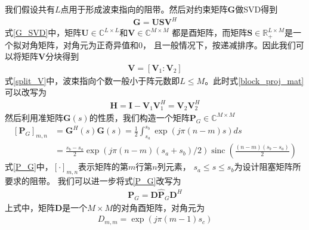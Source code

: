 \documentclass[master]{thesis-uestc}
\begin{document}
我们假设共有$L$点用于形成波束指向的阻带。然后对约束矩阵$\bm{G}$做SVD得到
\begin{equation}\label{G_SVD}
    \begin{aligned}
        \bm{G} = \bm{U}\bm{S}\bm{V}^H
    \end{aligned}
\end{equation}
式\eqref{G_SVD}中，矩阵$\bm{U}\in\mathbb{C}^{L\times L}$和$\bm{V}\in\mathbb{C}^{M\times M}$
都是酉矩阵，而矩阵$\bm{S}\in\mathbb{R}^{L\times M}_+$是一个拟对角矩阵，对角元为正奇异值和$0$，
且一般情况下，按递减排序。因此我们可以将矩阵$\bm{V}$分块得到
\begin{equation}\label{split_V}
    \begin{aligned}
        \bm{V} = \left[\bm{V}_1:\bm{V}_2\right]
    \end{aligned}
\end{equation}
式\eqref{split_V}中，波束指向个数一般小于阵元数即$L\le M$。此时式\eqref{block_proj_mat}可以改写为
\begin{equation}\label{block_proj_mat_V}
    \begin{aligned}
        \bm{H} = \bm{I} - \bm{V}_1\bm{V}_1^H = \bm{V}_2\bm{V}_2^H
    \end{aligned}
\end{equation}
然后利用准矩阵$\bm{G}(s)$的性质，我们构造一个矩阵$\bm{P}_G\in\mathbb{C}^{M\times M}$
\begin{equation}\label{P_G}
    \begin{aligned}
        \left[\bm{P}_G\right]_{m,n} &= \bm{G}^H(s)\bm{G}(s)
                                     = \frac{1}{2}\int_{s_a}^{s_b}\exp\left(j\pi(n-m)s\right)ds
        \\
                                    &= \frac{s_b-s_a}{2}\exp\left(j\pi(n-m)(s_a+s_b)/2\right)
                                       \operatorname{sinc}\left(\frac{(n-m)(s_b-s_a)}{2}\right)
    \end{aligned}
\end{equation}
式\eqref{P_G}中，$[\cdot]_{m,n}$表示矩阵的第$m$行第$n$列元素，
$s_a\le s \le s_b$为设计阻塞矩阵所要求的阻带。
我们可以进一步将式\eqref{P_G}改写为
\begin{equation}\label{P_G_fract}
    \begin{aligned}
        \bm{P}_G = \bm{D}\hat{\bm{P}}_G\bm{D}^H
    \end{aligned}
\end{equation}
上式中，矩阵$\bm{D}$是一个$M\times M$的对角酉矩阵，对角元为
\begin{equation}\label{mat_D}
    \begin{aligned}
        D_{m,m} = \exp\left(j\pi(m-1)s_c\right)
    \end{aligned}
\end{equation}
\end{document}
